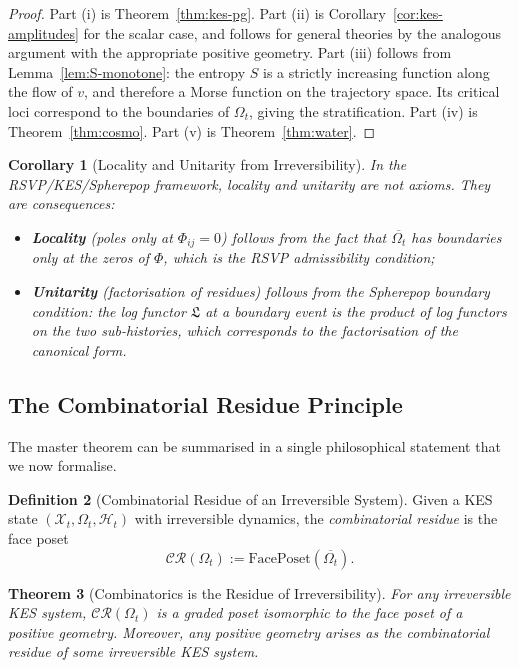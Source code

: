 \documentclass[12pt, oneside]{amsart}
\theoremstyle{plain}
\newtheorem{theorem}{Theorem}[section]
\newtheorem{corollary}[theorem]{Corollary}
\theoremstyle{definition}
\newtheorem{definition}[theorem]{Definition}
\theoremstyle{remark}
\newcommand{\XKS}{\mathcal{X}}
\newcommand{\OmKS}{\Omega}
\newcommand{\HKS}{\mathcal{H}}
\newcommand{\Log}{\mathfrak{L}}
\begin{document}
\begin{proof}
Part (i) is Theorem~\ref{thm:kes-pg}. Part (ii) is Corollary~\ref{cor:kes-amplitudes} for the scalar case, and follows for general theories by the analogous argument with the appropriate positive geometry. Part (iii) follows from Lemma~\ref{lem:S-monotone}: the entropy $S$ is a strictly increasing function along the flow of $v$, and therefore a Morse function on the trajectory space. Its critical loci correspond to the boundaries of $\OmKS_t$, giving the stratification. Part (iv) is Theorem~\ref{thm:cosmo}. Part (v) is Theorem~\ref{thm:water}.
\end{proof}

\begin{corollary}[Locality and Unitarity from Irreversibility]
\label{cor:locality-unitarity}
In the RSVP/KES/Spherepop framework, locality and unitarity are not axioms. They are consequences:
\begin{itemize}[noitemsep]
  \item \textbf{Locality} (poles only at $\Phi_{ij} = 0$) follows from the fact that $\overline{\OmKS_t}$ has boundaries only at the zeros of $\Phi$, which is the RSVP admissibility condition;
  \item \textbf{Unitarity} (factorisation of residues) follows from the Spherepop boundary condition: the log functor $\Log$ at a boundary event is the product of log functors on the two sub-histories, which corresponds to the factorisation of the canonical form.
\end{itemize}
\end{corollary}

\subsection{The Combinatorial Residue Principle}

The master theorem can be summarised in a single philosophical statement that we now formalise.

\begin{definition}[Combinatorial Residue of an Irreversible System]
\label{def:comb-residue}
Given a KES state $(\XKS_t, \OmKS_t, \HKS_t)$ with irreversible dynamics, the \emph{combinatorial residue} is the face poset
\[
  \mathcal{CR}(\OmKS_t) := \text{FacePoset}(\overline{\OmKS_t}).
\]
\end{definition}

\begin{theorem}[Combinatorics is the Residue of Irreversibility]
\label{thm:comb-residue}
For any irreversible KES system, $\mathcal{CR}(\OmKS_t)$ is a graded poset isomorphic to the face poset of a positive geometry. Moreover, any positive geometry arises as the combinatorial residue of some irreversible KES system.
\end{theorem}
\end{document}
